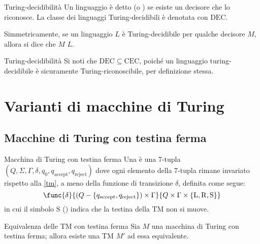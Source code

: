\documentclass[a4paper, 12pt]{report}
\begin{document}
    \begin{frameddefn}{Turing-decidibilità}
        Un linguaggio è detto  (o ) se esiste un decisore che lo riconosce. La classe dei linguaggi Turing-decidibili è denotata con $\mathrm{DEC}$.

        Simmetricamente, se un linguaggio $L$ è Turing-decidibile per qualche decisore $M$, allora si dice che $M$  $L$.
    \end{frameddefn}

    \begin{framedobs}{Turing-decidibilità}
        Si noti che $\mathrm{DEC} \subseteq \mathrm{CEC}$, poiché un linguaggio turing-decidibile è sicuramente Turing-riconoscibile, per definizione stessa.
    \end{framedobs}

    \section{Varianti di macchine di Turing}

    \subsection{Macchine di Turing con testina ferma}

    \begin{frameddefn}[label={stay tm}]{Macchina di Turing con testina ferma}
        Una  è una 7-tupla $(Q, \Sigma, \Gamma, \delta, q_0, q_\mathrm{accept}, q_\mathrm{reject})$ dove ogni elemento della 7-tupla rimane invariato rispetto alla \cref{tm}, a meno della funzione di transizione $\delta$, definita come segue: $$\func{\delta}{(Q - \{q_\mathrm{accept}, q_\mathrm{reject}\}) \times \Gamma}{Q \times \Gamma \times \{\mathrm L, \mathrm R, \mathrm S\}}$$ in cui il simbolo $\mathrm S$ () indica che la testina della TM non si muove.
    \end{frameddefn}

    \begin{framedprop}[label={stay tm equiv}]{Equivalenza delle TM con testina ferma}
        Sia $M$ una macchina di Turing con testina ferma; allora esiste una TM $M'$ ad essa equivalente.
    \end{framedprop}
\end{document}
